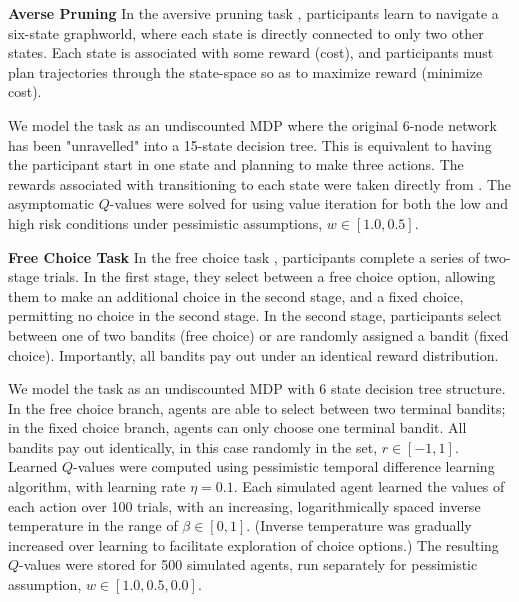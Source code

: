 \documentclass[11pt]{article} %
\begin{document}
\textbf{Averse Pruning} In the aversive pruning task \citep{Huys2012, Lally2017}, participants learn to navigate a six-state graphworld, where each state is directly connected to only two other states. Each state is associated with some reward (cost), and participants must plan trajectories through the state-space so as to maximize reward (minimize cost). 

We model the task as an undiscounted MDP where the original 6-node network has been "unravelled" into a 15-state decision tree. This is equivalent to having the participant start in one state and planning to make three actions. The rewards associated with transitioning to each state were taken directly from \citep{Huys2012, Lally2017}. The asymptomatic $Q$-values were solved for using value iteration for both the low and high risk conditions under pessimistic assumptions, $w \in [1.0, 0.5]$.

\textbf{Free Choice Task} In the free choice task \citep{Leotti2011}, participants complete a series of two-stage trials. In the first stage, they select between a free choice option, allowing them to make an additional choice in the second stage, and a fixed choice, permitting no choice in the second stage. In the second stage, participants select between one of two bandits (free choice) or are randomly assigned a bandit (fixed choice). Importantly, all bandits pay out under an identical reward distribution. 

We model the task as an undiscounted MDP with 6 state decision tree structure. In the free choice branch, agents are able to select between two terminal bandits; in the fixed choice branch, agents can only choose one terminal bandit. All bandits pay out identically, in this case randomly in the set, $r \in [-1, 1]$. Learned $Q$-values were computed using pessimistic temporal difference learning algorithm, with learning rate $\eta = 0.1$. Each simulated agent learned the values of each action over 100 trials, with an increasing, logarithmically spaced inverse temperature in the range of $\beta \in [0, 1]$. (Inverse temperature was gradually increased over learning to facilitate exploration of choice options.) The resulting $Q$-values were stored for 500 simulated agents, run separately for pessimistic assumption, $w \in [1.0, 0.5, 0.0]$. 


\small{}
\end{document}
